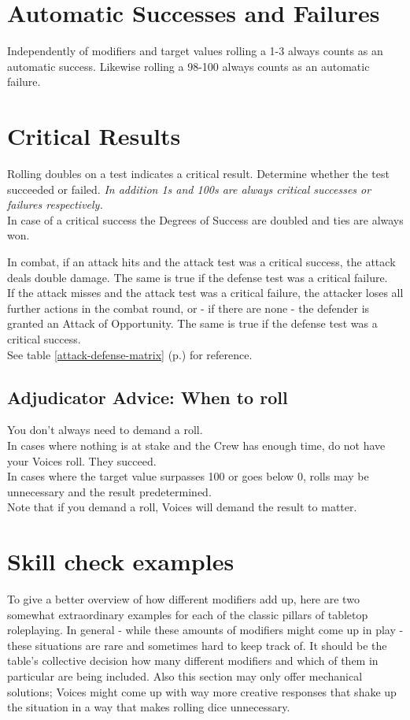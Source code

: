 \documentclass[11pt,a4paper,openany,dvipsnames]{book}
\begin{document}
	\section{Automatic Successes and Failures}
	Independently of modifiers and target values rolling a 1-3 always counts as an automatic success.
	Likewise rolling a 98-100 always counts as an automatic failure.
	\section{Critical Results}
	Rolling doubles on a test indicates a critical result. Determine whether the test succeeded or failed.
	\textit{In addition 1s and 100s are always critical successes or failures respectively.}\\
	In case of a critical success the Degrees of Success are doubled and ties are always won.
	\par
	In combat, if an attack hits and the attack test was a critical success, the attack deals double damage.
	The same is true if the defense test was a critical failure.
	\\%
	If the attack misses and the attack test was a critical failure,
		the attacker loses all further actions in the combat round,
		or - if there are none - the defender is granted an Attack of Opportunity.
	The same is true if the defense test was a critical success.
	\\%
	See table \ref{attack-defense-matrix} (p.\pageref{attack-defense-matrix}) for reference.

	\begin{exampleblock}
	\subsection*{Adjudicator Advice: When to roll}
	You don't always need to demand a roll.\\
	In cases where nothing is at stake and the Crew has enough time, do not have your Voices roll. They succeed.\\
	In cases where the target value surpasses 100 or goes below 0, rolls may be unnecessary and the result predetermined.\\
	Note that if you demand a roll, Voices will demand the result to matter.
	\end{exampleblock}

	\section{Skill check examples}
	To give a better overview of how different modifiers add up,
		here are two somewhat extraordinary examples for each of the classic pillars of tabletop roleplaying.
	In general - while these amounts of modifiers might come up in play -
		these situations are rare and sometimes hard to keep track of.
	It should be the table’s collective decision
		how many different modifiers and which of them in particular are being included.
	Also this section may only offer mechanical solutions;
		Voices might come up with way more creative responses
		that shake up the situation in a way that makes rolling dice unnecessary.
\end{document}
